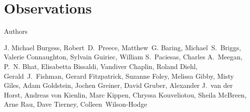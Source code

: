 




\section{Observations}
 \label{sec:observe}
\begin{centering}

Authors

J. Michael Burgess, Robert~D.~Preece, Matthew~G. Baring,
Michael~S.~Briggs, Valerie Connaughton, Sylvain Guiriec, William
S.~Paciesas, Charles A.~Meegan, P.~N. Bhat, Elisabetta Bissaldi,
Vandiver Chaplin, Roland Diehl, Gerald~J.~Fishman, Gerard Fitzpatrick,
Suzanne Foley, Melissa Gibby, Misty Giles, Adam Goldstein, Jochen
Greiner, David Gruber, Alexander J.~van der Horst, Andreas von
Kienlin, Marc Kippen, Chryssa Kouveliotou, Sheila McBreen, Arne Rau,
Dave Tierney, Colleen~Wilson-Hodge

\end{centering}
\hspace{2 cm}


